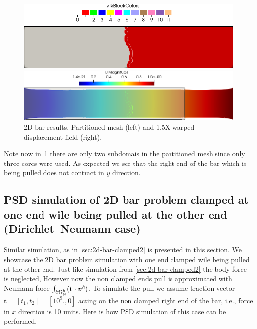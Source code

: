 \documentclass{report}
\newcommand{\bvh}{\boldsymbol v^h}
\begin{document}
\begin{figure}[htbp]
    \centering
    \begin{minipage}[t][2cm][t]{0.39\textwidth}
    \includegraphics[align=t,width=1\textwidth]{./Images/2d-bar-clamped-pulled-partioned.png}
    \end{minipage}\hspace{.1\textwidth}
    \begin{minipage}[t][2cm][t]{0.5\textwidth}
    \includegraphics[align=t,width=1\textwidth]{./Images/2d-bar-clamped-pulled.png}
    \end{minipage}
    \caption{2D bar results. Partitioned mesh (left) and 1.5X warped displacement field (right).}
    \label{fig:2part}
\end{figure}

Note now in~\cref{fig:2part} there are only two subdomais in the partitioned mesh since only three cores were used. As expected we see that the right end of the bar which is being pulled does not contract in $y$ direction.
\pagebreak


\subsection{PSD simulation of 2D bar problem clamped at one end wile being pulled at the other end (Dirichlet--Neumann case)\label{sec:2d-bar-clamped3}}


Similar simulation, as in \cref{sec:2d-bar-clamped2} is presented in this section. We showcase the 2D bar problem simulation with one end clamped wile being pulled at the other end. Just like simulation from \cref{sec:2d-bar-clamped2} the body force is neglected, However now  the non clamped ends pull is approximated with Neumann force $\int_{\partial\Omega^h_{\text N}}(\mathbf t\cdot \bvh)$. To simulate the pull we assume traction vector $\mathbf t=[t_1,t_2]=[10^9.,0]$ acting on the non clamped right end of the bar, i.e., force in $x$ direction is 10 units. Here is how PSD simulation of this case can be performed.
\end{document}
